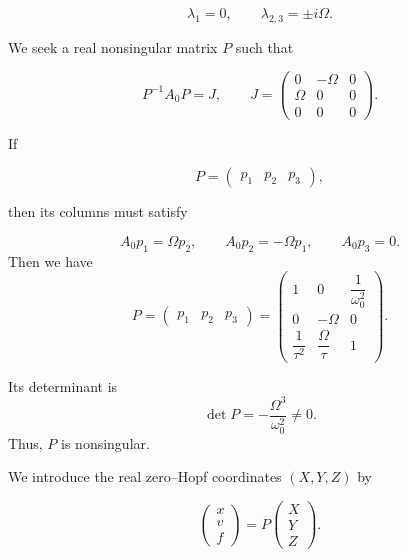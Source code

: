 \documentclass[11pt,reqno]{amsart}
\theoremstyle{plain}
\theoremstyle{definition}
\theoremstyle{remark}
\begin{document}
\[
\lambda_1=0,
\qquad
\lambda_{2,3}=\pm i\Omega.
\]

We seek a real nonsingular matrix $P$ such that

\begin{equation}
\label{eq:similarity-objective}
P^{-1}A_0P
=
J,
\qquad
J=
\begin{pmatrix}
0&-\Omega&0\\
\Omega&0&0\\
0&0&0
\end{pmatrix}.
\end{equation}

If

\[
P=
\begin{pmatrix}
p_1&p_2&p_3
\end{pmatrix},
\]

then its columns must satisfy

\begin{equation}
\label{eq:column-relations}
A_0p_1=\Omega p_2,
\qquad
A_0p_2=-\Omega p_1,
\qquad
A_0p_3=0.
\end{equation}
Then we have
\begin{equation}
\label{eq:P-general}
P=
\begin{pmatrix}
p_1&p_2&p_3
\end{pmatrix}
=
\begin{pmatrix}
1&0&\dfrac{1}{\omega_0^2}\\[3mm]
0&-\Omega&0\\[2mm]
\dfrac{1}{\tau^2}&
\dfrac{\Omega}{\tau}&1
\end{pmatrix}.
\end{equation}

Its determinant is
\begin{equation}
\label{eq:detP-general}
\det P
=
-\frac{\Omega^3}{\omega_0^2}
\neq0.
\end{equation}
Thus, $P$ is nonsingular.

We introduce the real zero--Hopf coordinates $(X,Y,Z)$ by

\begin{equation}
\label{eq:change-matrix-form}
\begin{pmatrix}
x\\v\\f
\end{pmatrix}
=
P
\begin{pmatrix}
X\\Y\\Z
\end{pmatrix}.
\end{equation}
\end{document}
